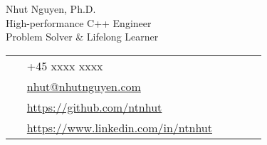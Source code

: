 \documentclass[11pt]{article} %
\begin{document}
\begin{paracol}{2}


\parbox[top][0.12\textheight][c]{\linewidth}{ %
	\vspace{-0.04\textheight} %
	\centering %
	{\sffamily\Huge Nhut Nguyen, Ph.D.}\\\medskip %
    \centering
    {\sffamily High-performance C++ Engineer \\ Problem Solver \& Lifelong Learner} %
}

\switchcolumn %

\parbox[top][0.12\textheight][c]{\linewidth}{ %
	\vspace{-0.04\textheight} %
	\colorbox{shade}{ %
		\begin{supertabular}{p{0.05\linewidth}|p{0.775\linewidth}} %
			\raisebox{-1pt}{\faPhone} & +45 xxxx xxxx \\ %
			\raisebox{0pt}{\small\faEnvelope} & \href{mailto:nhut@nhutnguyen.com}{nhut@nhutnguyen.com} \\ %
			\raisebox{-1pt}{\faGithub} & \href{https://github.com/ntnhut}{https://github.com/ntnhut} \\ %
			\raisebox{-1pt}{\faLinkedinSquare} & \href{https://www.linkedin.com/in/ntnhut}{https://www.linkedin.com/in/ntnhut} \\ %
		\end{supertabular}
	}
}


\end{paracol}
\end{document}
